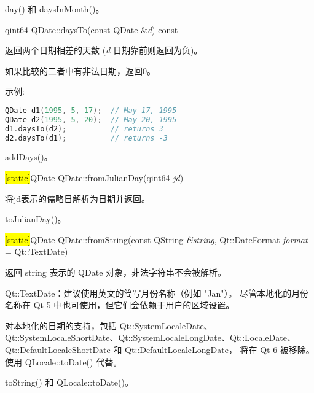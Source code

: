 \begin{seeAlso}
day() 和 daysInMonth()。
\end{seeAlso}

\splitLine

qint64 QDate::daysTo(const QDate \&\emph{d}) const

返回两个日期相差的天数 (\emph{d} 日期靠前则返回为负)。

如果比较的二者中有非法日期，返回0。

示例:

\begin{lstlisting}[language=C++]
QDate d1(1995, 5, 17);  // May 17, 1995
QDate d2(1995, 5, 20);  // May 20, 1995
d1.daysTo(d2);          // returns 3
d2.daysTo(d1);          // returns -3
\end{lstlisting}


\begin{seeAlso}
addDays()。
\end{seeAlso}

\splitLine

\hl{[static]}QDate QDate::fromJulianDay(qint64 \emph{jd})

将jd表示的儒略日解析为日期并返回。

\begin{seeAlso}
toJulianDay()。
\end{seeAlso}

\splitLine

\hl{[static]}QDate QDate::fromString(const QString \emph{\&string},
Qt::DateFormat \emph{format} = Qt::TextDate)

返回 string 表示的 QDate 对象，非法字符串不会被解析。

\begin{notice}
Qt::TextDate：建议使用英文的简写月份名称（例如 "Jan"）。
尽管本地化的月份名称在 Qt 5 中也可使用，但它们会依赖于用户的区域设置。
\end{notice}

\begin{notice}
对本地化的日期的支持，包括 Qt::SystemLocaleDate、Qt::SystemLocaleShortDate、Qt::SystemLocaleLongDate、Qt::LocaleDate、Qt::DefaultLocaleShortDate 和 Qt::DefaultLocaleLongDate，
将在 Qt 6 被移除。使用 QLocale::toDate() 代替。
\end{notice} 

\begin{seeAlso}
toString() 和 QLocale::toDate()。
\end{seeAlso}

\splitLine

